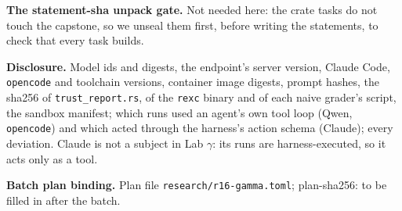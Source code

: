 \documentclass[11pt]{article}
\begin{document}
\begin{answer}
\textbf{The statement-sha unpack gate.} Not needed here: the crate tasks
do not touch the capstone, so we unseal them first, before writing the
statements, to check that every task builds.

\textbf{Disclosure.} Model ids and digests, the endpoint's server version,
Claude Code, \texttt{opencode} and toolchain versions, container image digests,
prompt hashes, the sha256 of \texttt{trust\_report.rs}, of the \texttt{rexc}
binary and of each naive grader's script, the sandbox manifest; which runs used
an agent's own tool loop (Qwen, \texttt{opencode}) and which acted through the
harness's action schema (Claude); every deviation. Claude is not a subject in
Lab $\gamma$: its runs are harness-executed, so it acts only as a tool.

\textbf{Batch plan binding.} Plan file \texttt{research/r16-gamma.toml};
plan-sha256: to be filled in after the batch.
\end{answer}
\end{document}
